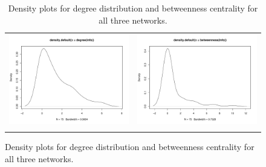 \documentclass[fleqn,12pt]{wlscirep}
\begin{document}
\begin{figure}
\begin{longtable}[!h]{cc}
\includegraphics[height=.2\textheight, clip=true, trim=1cm 1cm 0cm 2cm]{figures/deg_info.pdf} &
\includegraphics[height=.2\textheight, clip=true, trim=1cm 1cm 0cm 2cm]{figures/cen_info.pdf} \\
\caption{Density plots for degree distribution and betweenness centrality for all three networks.}
\label{fig:SS_plots} 
\end{longtable}
\end{figure}
\end{document}
